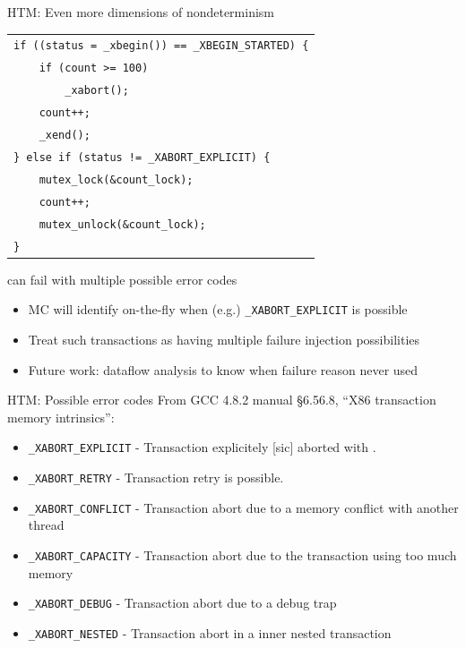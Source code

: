 \documentclass[xcolor=dvipsnames]{beamer}
\begin{document}
\begin{frame}{HTM: Even more dimensions of nondeterminism}
	\begin{center}
		\begin{tabular}{l}
			\texttt{if ((status = \_xbegin()) == \_XBEGIN\_STARTED) \{} \\
			\texttt{~~~~if (count >= 100)}\\
			\texttt{~~~~~~~~\_xabort();} \\
			\texttt{~~~~count++;} \\
			\texttt{~~~~\_xend();} \\
			\texttt{\} else if (status != \_XABORT\_EXPLICIT) \{} \\
			\texttt{~~~~mutex\_lock(\&count\_lock);} \\
			\texttt{~~~~count++;} \\
			\texttt{~~~~mutex\_unlock(\&count\_lock);} \\
			\texttt{\}} \\
		\end{tabular}
	\end{center}
	\linegap

	\xbegin can fail with multiple possible error codes
	\begin{itemize}
		\item MC will identify on-the-fly when (e.g.) {\tt \_XABORT\_EXPLICIT} is possible
		\item Treat such transactions as having multiple failure injection possibilities
		\item Future work: dataflow analysis to know when failure reason never used
	\end{itemize}
\end{frame}

\begin{frame}{HTM: Possible \xabort error codes}
	From GCC 4.8.2 manual \S 6.56.8, ``X86 transaction memory intrinsics'':
	\begin{itemize}
		\item {\tt \_XABORT\_EXPLICIT} - Transaction explicitely [sic] aborted with \xabort.
		\item {\tt \_XABORT\_RETRY} - Transaction retry is possible.
		\item {\tt \_XABORT\_CONFLICT} - Transaction abort due to a memory conflict with another thread
		\item {\tt \_XABORT\_CAPACITY} - Transaction abort due to the transaction using too much memory
		\item {\tt \_XABORT\_DEBUG} - Transaction abort due to a debug trap
		\item {\tt \_XABORT\_NESTED} - Transaction abort in a inner nested transaction
	\end{itemize}
\end{frame}
\end{document}
